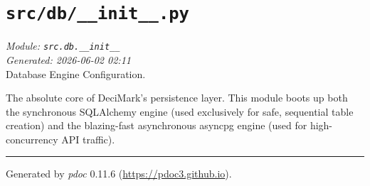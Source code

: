 
\section{\texttt{src/db/\_\_init\_\_.py}}
\textit{Module: \texttt{src.db.\_\_init\_\_}} \\
\textit{Generated: 2026-06-02 02:11} \\

Database Engine Configuration.

The absolute core of DeciMark's persistence layer. This module boots up
both the synchronous SQLAlchemy engine (used exclusively for safe,
sequential table creation) and the blazing-fast asynchronous asyncpg
engine (used for high-concurrency API traffic).

\begin{center}\rule{0.5\linewidth}{0.5pt}
\end{center}

Generated by \emph{pdoc} 0.11.6 (\url{https://pdoc3.github.io}).
